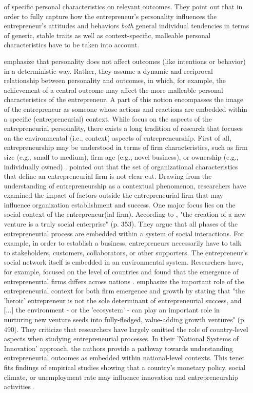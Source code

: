 \documentclass[a4paper,man,natbib]{apa6}
\begin{document}
of specific personal characteristics on relevant outcomes. They point out that in order to fully capture how the entrepreneur's personality influences the entrepreneur's attitudes and behaviors \textit{both} general individual tendencies in terms of generic, stable traits as well as context-specific, malleable personal characteristics have to be taken into account. \par
\cite{Obschonka2017} emphasize that personality does not affect outcomes (like intentions or behavior) in a deterministic way. Rather, they assume a dynamic and reciprocal relationship between personality and outcomes, in which, for example, the achievement of a central outcome may affect the more malleable personal characteristics of the entrepreneur. A part of this notion encompasses the image of the entrepreneur as someone whose actions and reactions are embedded within a specific (entrepreneurial) context. While \cite{Obschonka2017} focus on the aspects of the entrepreneurial personality, there exists a long tradition of research that focuses on the environmental (i.e., context) aspects of entrepreneurship. First of all, entrepreneurship may be understood in terms of firm characteristics, such as firm size (e.g., small to medium), firm age (e.g., novel business), or ownership (e.g., individually owned) \citep{Audretsch2012}. \cite{Audretsch2012} pointed out that the set of organizational characteristics that define an entrepreneurial firm is not clear-cut. Drawing from the understanding of entrepreneurship as a contextual phenomenon, researchers have examined the impact of factors outside the entrepreneurial firm that may influence organization establishment and success. One major focus lies on the social context of the entrepreneur(ial firm). According to \cite{Acs2006}, "the creation of a new venture is a truly social enterprise" (p. 353). They argue that all phases of the entrepreneurial process are embedded within a system of social interactions. For example, in order to establish a business, entrepreneurs necessarily have to talk to stakeholders, customers, collaborators, or other supporters. The entrepreneur's social network itself is embedded in an environmental system. Researchers have, for example, focused on the level of countries and found that the emergence of entrepreneurial firms differs across nations \citep{Reynolds1994}. \cite{Acs2014} emphasize the important role of the entrepreneurial context for both firm emergence and growth by stating that "the 'heroic' entrepreneur is not the sole determinant of entrepreneurial success, and [...] the environment - or the 'ecosystem' - can play an important role in nurturing new venture seeds into fully-fledged, value-adding growth ventures" (p. 490). They criticize that researchers have largely omitted the role of country-level aspects when studying entrepreneurial processes. In their 'National Systems of Innovation' approach, the authors provide a pathway towards understanding entrepreneurial outcomes as embedded within national-level contexts. This tenet fits findings of empirical studies showing that a country's monetary policy, social climate, or unemployment rate may influence innovation and entrepreneurship activities \cite[e.g.][]{Galindo2014, Marcotte2013, Spencer2004}. \par
\end{document}
